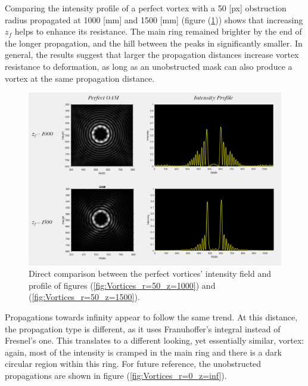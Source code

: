 Comparing the intensity profile of a perfect vortex with a 50 [px] obstruction radius propagated at 1000 [mm] and 1500 [mm] (figure (\ref{fig:perfects_1000_vs_1500})) shows that increasing $z_f$ helps to enhance its resistance. The main ring remained brighter by the end of the longer propagation, and the hill between the peaks in significantly smaller. In general, the results suggest that larger the propagation distances increase vortex resistance to deformation, as long as an unobstructed mask can also produce a vortex at the same propagation distance. 

\begin{figure}[htbp]
    \centering
    \includegraphics[width=14cm]{images/c04/Different_zf_same_obs.png}
    \caption{Direct comparison between the perfect vortices' intensity field and profile of figures (\ref{fig:Vortices_r=50_z=1000}) and (\ref{fig:Vortices_r=50_z=1500}).}
    \label{fig:perfects_1000_vs_1500}
\end{figure}

Propagations towards infinity appear to follow the same trend. At this distance, the propagation type is different, as it uses Franuhoffer's integral instead of Fresnel's one. This translates to a different looking, yet essentially similar, vortex: again, most of the intensity is cramped in the main ring and there is a dark circular region within this ring. For future reference, the unobstructed propagations are shown in figure (\ref{fig:Vortices_r=0_z=inf}).

